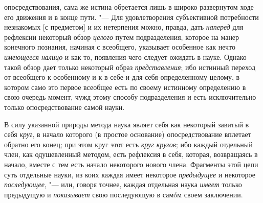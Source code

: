 {{опосредствования, сама же истина обретается лишь в широко развернутом ходе
его движения и в конце пути. "--- Для удовлетворения
субъективной потребности незнакомых [с предметом] и их нетерпения можно,
правда, дать {\em наперед} для рефлексии некоторый обзор {\em целого} путем
подразделения, которое на манер конечного познания, начиная с всеобщего,
указывает особенное как нечто {\em имеющееся налицо} и
как то, появления чего следует ожидать в науке. Однако такой обзор дает
только некоторый образ {\em представления}; ибо
истинный переход от всеобщего к особенному и к
в-себе-и-для-себя-определенному целому, в котором само это первое всеобщее
есть по своему истинному определению в свою очередь момент, чужд этому
способу подразделения и есть исключительно только опосредствование самой науки.

В силу указанной природы метода наука являет себя как некоторый завитый в себя
{\em круг}, в начало которого (в простое основание) опосредствование вплетает
обратно его конец; при этом круг этот есть {\em круг кругов}; ибо каждый
отдельный член, как одушевленный методом, есть рефлексия в себя, которая,
возвращаясь в начало, вместе с тем есть начало некоторого нового члена.
Фрагменты этой цепи суть отдельные науки, из коих каждая имеет некоторое
{\em предыдущее} и некоторое {\em последующее}, "--- или, говоря точнее,
каждая отдельная наука {\em имеет} только предыдущую и {\em показывает}
свою последующую в самóм своем заключении.

}}
